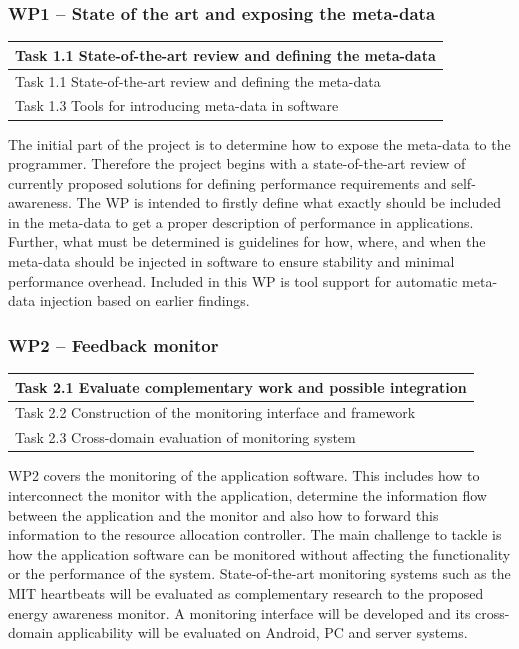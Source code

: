 \documentclass{article}
\begin{document}
\subsubsection{WP1 -- State of the art and exposing the meta-data}
\begin{table}
\vspace{-0.5cm}
\small
\begin{tabular}{ | l |}
\hline
{Task 1.1 State-of-the-art review and defining the meta-data}  \\ \hline
{Task 1.1 State-of-the-art review and defining the meta-data}  \\ \hline
{Task 1.3 Tools for introducing meta-data in software}		\\ \hline
\end{tabular}
\vspace{-0.3cm}
\end{table}
The initial part of the project is to determine how to expose the meta-data to the programmer.
Therefore the project begins with a state-of-the-art review of currently proposed solutions for defining performance requirements and self-awareness.
The WP is intended to firstly define what exactly should be included in the meta-data to get a proper description of performance in applications. 
Further, what must be determined is guidelines for how, where, and when the meta-data should be injected in software to ensure stability and minimal performance overhead.
Included in this WP is tool support for automatic meta-data injection based on earlier findings.

\subsubsection{WP2 -- Feedback monitor}
\begin{table}
\vspace{-0.5cm}
\small
\begin{tabular}{ | l |}
\hline
Task 2.1 Evaluate complementary work and possible integration  \\ \hline
Task 2.2 Construction of the monitoring interface and framework   \\ \hline
Task 2.3 Cross-domain evaluation of monitoring system	\\ \hline
\end{tabular}
\vspace{-0.3cm}
\end{table}
WP2 covers the monitoring of the application software.
This includes how to interconnect the monitor with the application, determine the information flow between the application and the monitor and also how to forward this information to the resource allocation controller.
The main challenge to tackle is how the application software can be monitored without affecting the functionality or the performance of the system.
State-of-the-art monitoring systems such as the MIT heartbeats \cite{Hoffmann:10} will be evaluated as complementary research to the proposed energy awareness monitor.
A monitoring interface will be developed and its cross-domain applicability will be evaluated on Android, PC and server systems.
\end{document}
